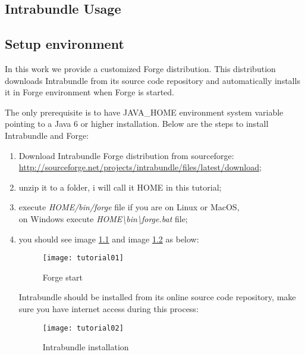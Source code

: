 \begin{appendices}

\chapter{Intrabundle Usage}

\section{Setup environment}

In this work we provide a customized Forge distribution. This distribution downloads Intrabundle from its source code repository and automatically installs it in Forge environment when Forge is started.

The only prerequisite is to have JAVA\_HOME environment system variable pointing to a Java 6 or higher installation. Below are the steps to install Intrabundle and Forge:


\begin{enumerate}
\item Download Intrabundle Forge distribution from sourceforge: \\ \href{http://sourceforge.net/projects/intrabundle/files/latest/download}{http://sourceforge.net/projects/intrabundle/files/latest/download};
\item unzip it to a folder, i will call it HOME in this tutorial;
\item execute \emph{HOME/bin/forge} file if you are on Linux or MacOS, \\on Windows execute  \emph{HOME\textbackslash{}bin\textbackslash{}forge.bat} file;
\item you should see image \ref{forge start} and image \ref{intrabundle installation} as below:
\begin{figure}[h]
\caption{Forge start}
\label{forge start}
\centering
\texttt{[image: tutorial01]}
\end{figure}
\FloatBarrier

Intrabundle should be installed from its online source code repository, make sure you have internet access during this process:

\begin{figure}[h]
\caption{Intrabundle installation}
\label{intrabundle installation}
\centering
\texttt{[image: tutorial02]}
\end{figure}
\FloatBarrier
\end{enumerate}


\end{appendices}
